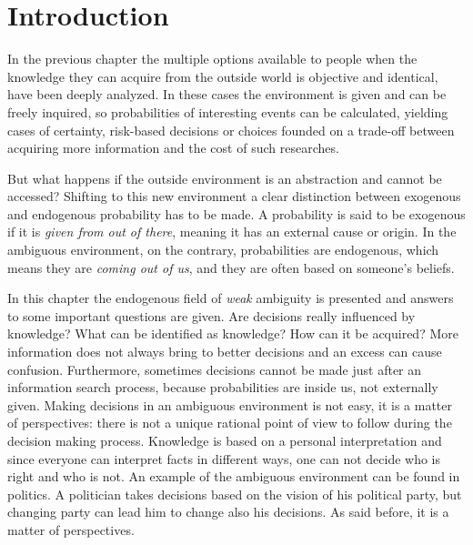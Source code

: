 \section{Introduction}
In the previous chapter the multiple options available to people when the knowledge they can acquire from the outside world is objective and identical, have been deeply analyzed. In these cases the environment is given and can be freely inquired, so probabilities of interesting events can be calculated, yielding cases of certainty, risk-based decisions or choices founded on a trade-off between acquiring more information and the cost of such researches.

But what happens if the outside environment is an abstraction and cannot be accessed? Shifting to this new environment a clear distinction between exogenous and endogenous probability has to be made. A probability is said to be exogenous if it is \textit{given from out of there}, meaning it has an external cause or origin. In the ambiguous environment, on the contrary, probabilities are endogenous, which means they are \textit{coming out of us}, and they are often based on someone’s beliefs.

In this chapter the endogenous field of \textit{weak} ambiguity is presented and answers to some important questions are given. Are decisions really influenced by knowledge? What can be identified as knowledge? How can it be acquired? More information does not always bring to better decisions and an excess can cause confusion. Furthermore, sometimes decisions cannot be made just after an information search process, because probabilities are inside us, not externally given. Making decisions in an ambiguous environment is not easy, it is a matter of perspectives: there is not a unique rational point of view to follow during the decision making process.
Knowledge is based on a personal interpretation and since everyone can interpret facts in different ways, one can not decide who is right and who is not. An example of the ambiguous environment can be found in politics. A politician takes decisions based on the vision of his political party, but changing party can lead him to change also his decisions. As said before, it is a matter of perspectives.

